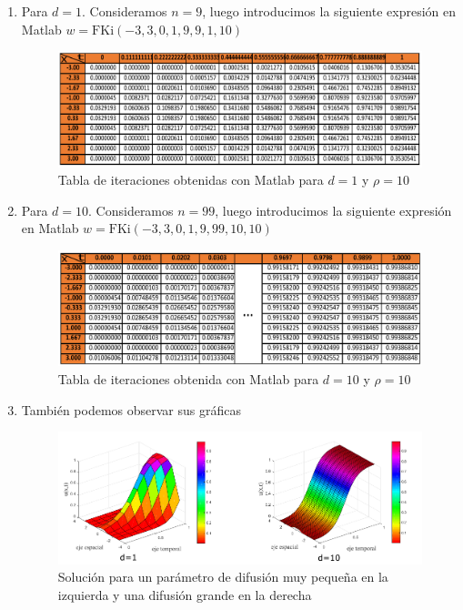 \begin{enumerate}
	\item Para $d=1$. Consideramos $n=9$, luego introducimos la siguiente expresión en Matlab $w=\text{FKi}(-3,3,0,1,9,9,1,10)$
				\begin{figure}[H]
					\centering
					\includegraphics[scale=0.9]{simulacion/tablad1.pdf}
					\caption{{\footnotesize Tabla de iteraciones obtenidas con Matlab para $d=1$ y $\rho =10$}}
				\end{figure}
	\item Para $d=10$. Consideramos $n=99$, luego introducimos la siguiente expresión en Matlab $w=\text{FKi}(-3,3,0,1,9,99,10,10)$
				\begin{figure}[H]
					\centering
					\includegraphics[scale=0.9]{simulacion/tablad10.pdf}
					\caption{{\footnotesize Tabla de iteraciones obtenida con Matlab para $d=10$ y $\rho =10$}}
				\end{figure}
	\item También podemos observar sus gráficas
				\begin{figure}[h]
					\centering
					\includegraphics[scale=1]{simulacion/graficodeD.pdf}
					\caption{{\footnotesize Solución para un parámetro de difusión muy pequeña en la izquierda y una difusión grande en la derecha}}
					\label{figuraD}
				\end{figure}
	
\end{enumerate}

